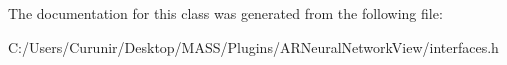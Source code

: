 The documentation for this class was generated from the following file\+:\begin{DoxyCompactItemize}
\item 
C\+:/\+Users/\+Curunir/\+Desktop/\+M\+A\+S\+S/\+Plugins/\+A\+R\+Neural\+Network\+View/interfaces.\+h\end{DoxyCompactItemize}
